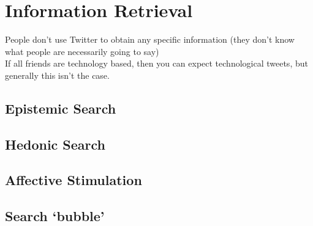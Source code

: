\section{Information Retrieval}
People don't use Twitter to obtain any specific information (they don't know what people are necessarily going to say) \\
If all friends are technology based, then you can expect technological tweets, but generally this isn't the case.
\subsection{Epistemic Search}

\subsection{Hedonic Search}

\subsection{Affective Stimulation}

\subsection{Search `bubble'}

